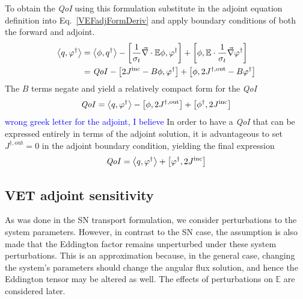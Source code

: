 \documentclass[12pt]{report}
\newcommand{\bra}{\left\langle}
\newcommand{\ket}{\right\rangle}
\newcommand{\sbra}{\left[}
\newcommand{\sket}{\right]}
\renewcommand{\div}{\vec{\nabla} \cdot}
\newcommand{\grad}{\vec{\nabla}}
\newcommand{\vefadj}{\varphi^\dag}
\newcommand{\Edd}{\mathbb{E}}
\newcommand{\sigt}{\sigma_t}
\newcommand{\scalSource}{q}
\newcommand{\scalResp}{q^\dag}
\newcommand{\qoi}{{\it QoI}\xspace}
\newcommand{\comment}[2]{\marginpar{\textcolor{#2}{$\star$}}\textcolor{#2}{#1}\newline}
\newcommand{\jcr}[1]{\comment{#1}{blue}}
\newcommand{\jcr}[1]{\phantom{a}}
\begin{document}
To obtain the \qoi using this formulation substitute in the adjoint equation definition into Eq.~\eqref{VEFadjFormDeriv} and apply boundary conditions of both the forward and adjoint.
\begin{equation}
\label{VETQoIAdjUnpDeriv}
\begin{split}
 \bra \scalSource , \vefadj \ket &=   \bra \phi, \scalResp \ket - \sbra \frac{1}{\sigt}\div \Edd \phi, \vefadj \sket + \sbra \phi, \Edd \cdot \frac{1}{\sigt} \grad \vefadj \sket \\
&=   \qoi - \sbra 2J^{\text{inc}} - B \phi, \vefadj \sket + \sbra \phi, 2J^{\dag,\text{out}} - B \vefadj \sket \\
\end{split}
\end{equation}
The $B$ terms negate and yield a relatively compact form for the \qoi
\begin{equation}
\label{VETQoIAdj}
\qoi=\bra \scalSource , \vefadj \ket 
- \sbra \phi, 2J^{\dag,\text{out}} \sket  + \sbra \phi^\dag, 2J^{\text{inc}} \sket
\end{equation}
\jcr{wrong greek letter for the adjoint, I believe}
In order to have a \qoi that can be expressed entirely in terms of the adjoint solution, it is advantageous to 
set $J^{\dag,\text{out}}=0$ in the adjoint boundary condition, yielding the final expression
\begin{equation}
\qoi=\bra \scalSource , \vefadj \ket  + \sbra \vefadj, 2J^{\text{inc}} \sket
\end{equation}

\subsection{VET adjoint sensitivity}

As was done in the SN transport formulation, we consider perturbations to the system parameters. However, in contrast to the SN case, the assumption is also made that the Eddington factor remains unperturbed under these system perturbations. This is an approximation because, in the general case, changing the system's parameters should change the angular flux solution, and hence
the Eddington tensor may be altered as well. The effects of perturbations on $\Edd$ are considered later.
\end{document}
